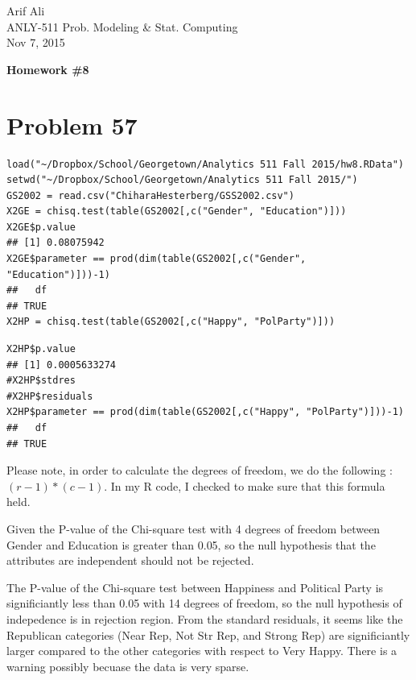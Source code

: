 \documentclass{article}\usepackage[]{graphicx}\usepackage[]{color}
\makeatletter
\newenvironment{kframe}{%
 \def\at@end@of@kframe{}%
 \ifinner\ifhmode%
  \def\at@end@of@kframe{\end{minipage}}%
  \begin{minipage}{\columnwidth}%
 \fi\fi%
 \def\FrameCommand##1{\hskip\@totalleftmargin \hskip-\fboxsep
 \colorbox{shadecolor}{##1}\hskip-\fboxsep
     \hskip-\linewidth \hskip-\@totalleftmargin \hskip\columnwidth}%
 \MakeFramed {\advance\hsize-\width
   \@totalleftmargin\z@ \linewidth\hsize
   \@setminipage}}%
 {\par\unskip\endMakeFramed%
 \at@end@of@kframe}
\newenvironment{knitrout}{}{} %
\makeatother
\begin{document}
\begin{flushright}
  Arif Ali\\
  ANLY-511 Prob. Modeling \& Stat. Computing\\
	Nov 7, 2015\\
\end{flushright}

\begin{center}
  \LARGE\textbf{Homework \#8}
\end{center}
\section*{Problem 57}
\begin{knitrout}
\color{fgcolor}\begin{kframe}
\begin{verbatim}
load("~/Dropbox/School/Georgetown/Analytics 511 Fall 2015/hw8.RData")
setwd("~/Dropbox/School/Georgetown/Analytics 511 Fall 2015/")
GS2002 = read.csv("ChiharaHesterberg/GSS2002.csv")
X2GE = chisq.test(table(GS2002[,c("Gender", "Education")]))
X2GE$p.value
## [1] 0.08075942
X2GE$parameter == prod(dim(table(GS2002[,c("Gender", "Education")]))-1)
##   df 
## TRUE
X2HP = chisq.test(table(GS2002[,c("Happy", "PolParty")]))
\end{verbatim}


{\ttfamily\noindent{}}\begin{verbatim}
X2HP$p.value
## [1] 0.0005633274
#X2HP$stdres
#X2HP$residuals
X2HP$parameter == prod(dim(table(GS2002[,c("Happy", "PolParty")]))-1)
##   df 
## TRUE
\end{verbatim}
\end{kframe}
\end{knitrout}
Please note, in order to calculate the degrees of freedom, we do the following : $(r-1)*(c-1)$. In my R code, I checked to make sure that this formula held.

Given the P-value of the Chi-square test with 4 degrees of freedom between Gender and Education is greater than 0.05, so the null hypothesis that the attributes are independent should not be rejected. 

The P-value of the Chi-square test between Happiness and Political Party is significiantly less than 0.05 with 14 degrees of freedom, so the null hypothesis of indepedence is in rejection region. From the standard residuals, it seems like the Republican categories (Near Rep, Not Str Rep, and Strong Rep) are significiantly larger compared to the other categories with respect to Very Happy. There is a warning possibly becuase the data is very sparse.
\end{document}
